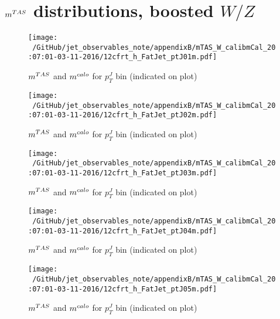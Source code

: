 \newpage
\clearpage
\vspace*{\fill}
\section{$m^{TAS}$ distributions, boosted $W/Z$}
\vfill
\clearpage
\twocolumn

\begin{figure}
 
\texttt{[image: ~/GitHub/jet\_observables\_note/appendixB/mTAS\_W\_calibmCal\_20:07:01-03-11-2016/12cfrt\_h\_FatJet\_ptJ01m.pdf]}
\caption{$m^{TAS}$ and $m^{calo}$ for $p_{T}^{J}$ bin (indicated on plot) }
 
\end{figure}
 
\begin{figure}
 
\texttt{[image: ~/GitHub/jet\_observables\_note/appendixB/mTAS\_W\_calibmCal\_20:07:01-03-11-2016/12cfrt\_h\_FatJet\_ptJ02m.pdf]}
\caption{$m^{TAS}$ and $m^{calo}$ for $p_{T}^{J}$ bin (indicated on plot) }
 
\end{figure}
 
\begin{figure}
 
\texttt{[image: ~/GitHub/jet\_observables\_note/appendixB/mTAS\_W\_calibmCal\_20:07:01-03-11-2016/12cfrt\_h\_FatJet\_ptJ03m.pdf]}
\caption{$m^{TAS}$ and $m^{calo}$ for $p_{T}^{J}$ bin (indicated on plot) }
 
\end{figure}
 
\begin{figure}
 
\texttt{[image: ~/GitHub/jet\_observables\_note/appendixB/mTAS\_W\_calibmCal\_20:07:01-03-11-2016/12cfrt\_h\_FatJet\_ptJ04m.pdf]}
\caption{$m^{TAS}$ and $m^{calo}$ for $p_{T}^{J}$ bin (indicated on plot) }
 
\end{figure}
 
\begin{figure}
 
\texttt{[image: ~/GitHub/jet\_observables\_note/appendixB/mTAS\_W\_calibmCal\_20:07:01-03-11-2016/12cfrt\_h\_FatJet\_ptJ05m.pdf]}
\caption{$m^{TAS}$ and $m^{calo}$ for $p_{T}^{J}$ bin (indicated on plot) }
 
\end{figure}
 
